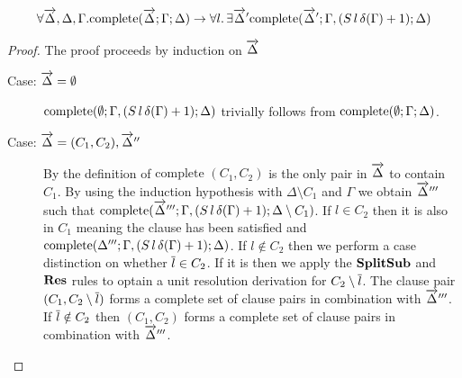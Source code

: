 \begin{mylemma}\label{lem:compsplit}
\begin{align*}\forall \overrightarrow{\Delta},\Delta,\Gamma.  \mathrm{complete}(\overrightarrow{\Delta};\Gamma; \Delta) \to \forall l. \, \exists \overrightarrow{\Delta}' \mathrm{complete}(\overrightarrow{\Delta}';\Gamma, (S \, l \, \delta(\Gamma) + 1); \Delta)
\end{align*}
\begin{proof}
The proof proceeds by induction on $\overrightarrow{\Delta}$
\begin{description}
\item[Case: $\overrightarrow{\Delta} = \emptyset$] 
$\mathrm{complete}(\emptyset;\Gamma, (S \, l \, \delta(\Gamma) + 1); \Delta)$ trivially follows from $\mathrm{complete}(\emptyset;\Gamma; \Delta)$.
\item[Case: $\overrightarrow{\Delta} = (C_1,C_2),\overrightarrow{\Delta}''$]
By the definition of $\mathrm{complete}$ $(C_1, C_2)$ is the only pair in $\overrightarrow{\Delta}$ to contain $C_1$.  By using the induction hypothesis with $\Delta \setminus C_1$ and $\Gamma$ we obtain $\overrightarrow{\Delta}'''$ such that $\mathrm{complete}(\overrightarrow{\Delta}''';\Gamma, (S \, l \, \delta(\Gamma) + 1); \Delta \setminus C_1)$.  If $l \in C_2$ then it is also in $C_1$ meaning the clause has been satisfied and $\mathrm{complete}(\Delta''';\Gamma, (S \, l \, \delta(\Gamma) + 1); \Delta)$. If $l \notin C_2$ then we perform a case distinction on whether $\overline{l} \in C_2$. If it is then we apply the $\mathbf{SplitSub}$ and $\mathbf{Res}$ rules to optain a unit resolution derivation for $C_2 \setminus \overline{l}$. The clause pair $(C_1,C_2 \setminus \overline{l})$ forms a complete set of clause pairs in combination with $\overrightarrow{\Delta}'''$. If $\overline{l} \notin C_2$ then $(C_1,C_2)$ forms a complete set of clause pairs in combination with $\overrightarrow{\Delta}'''$.

\end{description}
\end{proof}

\end{mylemma}


